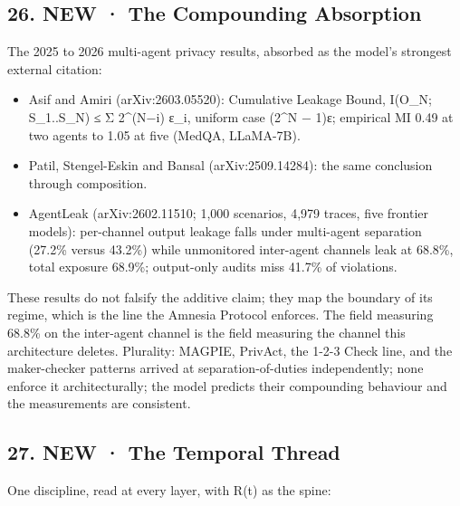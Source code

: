\documentclass[
]{article}
\newcounter{none} %
\providecommand{\tightlist}{%
  \setlength{\itemsep}{0pt}\setlength{\parskip}{0pt}}
\begin{document}
\subsection{26. NEW · The Compounding
Absorption}\label{new-the-compounding-absorption}

The 2025 to 2026 multi-agent privacy results, absorbed as the model's
strongest external citation:

\begin{itemize}
\tightlist
\item
  Asif and Amiri (arXiv:2603.05520): Cumulative Leakage Bound, I(O\_N;
  S\_1..S\_N) ≤ Σ 2\^{}(N−i) ε\_i, uniform case (2\^{}N − 1)ε; empirical
  MI 0.49 at two agents to 1.05 at five (MedQA, LLaMA-7B).
\item
  Patil, Stengel-Eskin and Bansal (arXiv:2509.14284): the same
  conclusion through composition.
\item
  AgentLeak (arXiv:2602.11510; 1,000 scenarios, 4,979 traces, five
  frontier models): per-channel output leakage falls under multi-agent
  separation (27.2\% versus 43.2\%) while unmonitored inter-agent
  channels leak at 68.8\%, total exposure 68.9\%; output-only audits
  miss 41.7\% of violations.
\end{itemize}

These results do not falsify the additive claim; they map the boundary
of its regime, which is the line the Amnesia Protocol enforces. The
field measuring 68.8\% on the inter-agent channel is the field measuring
the channel this architecture deletes. Plurality: MAGPIE, PrivAct, the
1-2-3 Check line, and the maker-checker patterns arrived at
separation-of-duties independently; none enforce it architecturally; the
model predicts their compounding behaviour and the measurements are
consistent.

\subsection{27. NEW · The Temporal
Thread}\label{new-the-temporal-thread}

One discipline, read at every layer, with R(t) as the spine:
\end{document}
